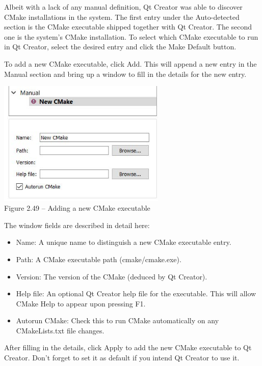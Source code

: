 Albeit with a lack of any manual definition, Qt Creator was able to discover CMake installations in the system. The first entry under the Auto-detected section is the CMake executable shipped together with Qt Creator. The second one is the system's CMake installation. To select which CMake executable to run in Qt Creator, select the desired entry and click the Make Default button.

To add a new CMake executable, click Add. This will append a new entry in the Manual section and bring up a window to fill in the details for the new entry.

\begin{center}
\includegraphics[width=0.6\textwidth]{content/1/chapter2/images/49.jpg}\\
Figure 2.49 – Adding a new CMake executable
\end{center}

The window fields are described in detail here:

\begin{itemize}
\item 
Name: A unique name to distinguish a new CMake executable entry.

\item 
Path: A CMake executable path (cmake/cmake.exe).

\item 
Version: The version of the CMake (deduced by Qt Creator).

\item 
Help file: An optional Qt Creator help file for the executable. This will allow CMake Help to appear upon pressing F1.

\item 
Autorun CMake: Check this to run CMake automatically on any CMakeLists.txt file changes.
\end{itemize}

After filling in the details, click Apply to add the new CMake executable to Qt Creator. Don't forget to set it as default if you intend Qt Creator to use it.


